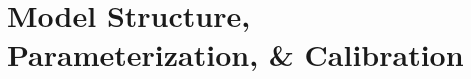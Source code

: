 \chapter{Model Structure, Parameterization, \& Calibration}\label{model}






\printchapterbibliography